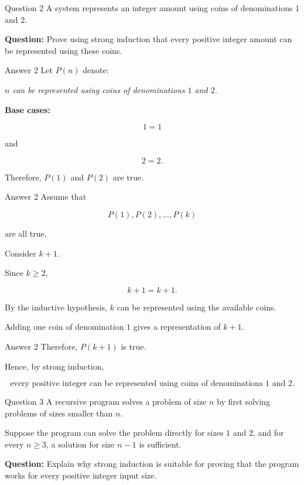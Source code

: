 
\begin{frame}{Question 2}
A system represents an integer amount using coins of denominations $1$ and $2$.

\textbf{Question:} Prove using strong induction that every positive integer amount can be represented using these coins.
\end{frame}

\begin{frame}{Answer 2}
Let $P(n)$ denote:

\textit{$n$ can be represented using coins of denominations $1$ and $2$.}

\textbf{Base cases:}

$$
1=1
$$

and

$$
2=2.
$$

Therefore, $P(1)$ and $P(2)$ are true.
\end{frame}

\begin{frame}{Answer 2}
Assume that

$$
P(1),P(2),\ldots,P(k)
$$

are all true.

Consider $k+1$.

Since $k\geq2$,

$$
k+1=k+1.
$$

By the inductive hypothesis, $k$ can be represented using the available coins.

Adding one coin of denomination $1$ gives a representation of $k+1$.
\end{frame}

\begin{frame}{Answer 2}
Therefore, $P(k+1)$ is true.

Hence, by strong induction,

$$
\boxed{\text{every positive integer can be represented using coins of denominations }1\text{ and }2.}
$$

\end{frame}


\begin{frame}{Question 3}
A recursive program solves a problem of size $n$ by first solving problems of sizes smaller than $n$.

Suppose the program can solve the problem directly for sizes $1$ and $2$, and for every $n\geq3$, a solution for size $n-1$ is sufficient.

\textbf{Question:} Explain why strong induction is suitable for proving that the program works for every positive integer input size.
\end{frame}

